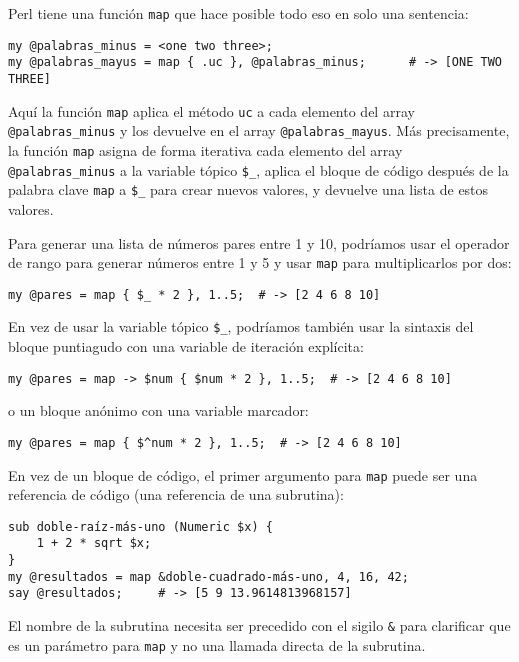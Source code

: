 Perl tiene una función {\tt map} que hace posible todo eso
en solo una sentencia:

\begin{verbatim}
my @palabras_minus = <one two three>;
my @palabras_mayus = map { .uc }, @palabras_minus;      # -> [ONE TWO THREE]
\end{verbatim}
%

Aquí la función {\tt map} aplica el método {\tt uc} a cada
elemento del array \verb|@palabras_minus| y los devuelve
en el array \verb|@palabras_mayus|. Más precisamente, 
la función {\tt map} asigna de forma iterativa cada elemento
del array \verb|@palabras_minus| a la variable tópico \verb|$_|,
aplica el bloque de código después de la palabra clave {\tt map}
a \verb|$_| para crear nuevos valores, y devuelve una lista de estos
valores.

Para generar una lista de números pares entre 1 y 10, podríamos
usar el operador de rango para generar números entre 1 y 5
y usar {\tt map} para multiplicarlos por dos:

\begin{verbatim}
my @pares = map { $_ * 2 }, 1..5;  # -> [2 4 6 8 10]
\end{verbatim}
%

En vez de usar la variable tópico \verb|$_|, podríamos también
usar la sintaxis del bloque puntiagudo con una variable de 
iteración explícita:

\begin{verbatim}
my @pares = map -> $num { $num * 2 }, 1..5;  # -> [2 4 6 8 10]
\end{verbatim}
%

o un bloque anónimo con una variable marcador:

\begin{verbatim}
my @pares = map { $^num * 2 }, 1..5;  # -> [2 4 6 8 10]
\end{verbatim}
%

En vez de un bloque de código, el primer argumento para {\tt map}
puede ser una referencia de código (una referencia de una
subrutina):

\begin{verbatim}
sub doble-raíz-más-uno (Numeric $x) { 
    1 + 2 * sqrt $x;
}
my @resultados = map &doble-cuadrado-más-uno, 4, 16, 42;
say @resultados;     # -> [5 9 13.9614813968157]
\end{verbatim}
%

El nombre de la subrutina necesita ser precedido con el 
sigilo {\tt \&} para clarificar que es un parámetro para 
{\tt map} y no una llamada directa de la subrutina.

